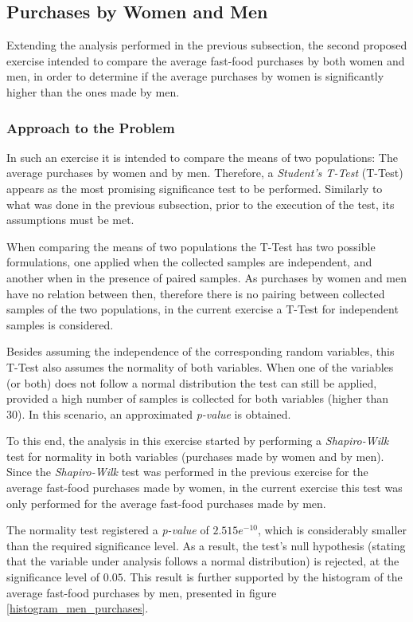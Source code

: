 \documentclass[12pt]{article}
\begin{document}
\subsection{Purchases by Women and Men}

Extending the analysis performed in the previous subsection, the second proposed exercise intended to compare the average fast-food purchases by both women and men, in order to determine if the average purchases by women is significantly higher than the ones made by men.

\subsubsection{Approach to the Problem}

In such an exercise it is intended to compare the means of two populations: The average purchases by women and by men. Therefore, a \emph{Student's T-Test} (T-Test) appears as the most promising significance test to be performed. Similarly to what was done in the previous subsection, prior to the execution of the test, its assumptions must be met.

When comparing the means of two populations the T-Test has two possible formulations, one applied when the collected samples are independent, and another when in the presence of paired samples. As purchases by women and men have no relation between then, therefore there is no pairing between collected samples of the two populations, in the current exercise a T-Test for independent samples is considered.

Besides assuming the independence of the corresponding random variables, this T-Test also assumes the normality of both variables. When one of the variables (or both) does not follow a normal distribution the test can still be applied, provided a high number of samples is collected for both variables (higher than 30). In this scenario, an approximated \emph{p-value} is obtained.

To this end, the analysis in this exercise started by performing a \emph{Shapiro-Wilk} test for normality in both variables (purchases made by women and by men). Since the \emph{Shapiro-Wilk} test was performed in the previous exercise for the average fast-food purchases made by women, in the current exercise this test was only performed for the average fast-food purchases made by men.

The normality test registered a \emph{p-value} of $2.515e^{-10}$, which is considerably smaller than the required significance level. As a result, the test's null hypothesis (stating that the variable under analysis follows a normal distribution) is rejected, at the significance level of $0.05$. This result is further supported by the histogram of the average fast-food purchases by men, presented in figure \ref{histogram_men_purchases}.
\end{document}
